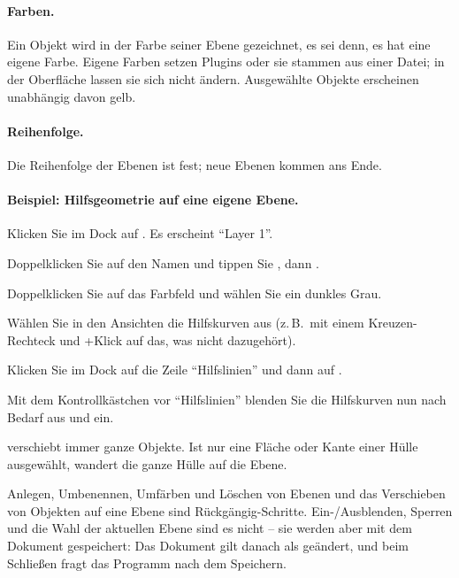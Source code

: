 \paragraph{Farben.} Ein Objekt wird in der Farbe seiner Ebene gezeichnet, es sei denn, es hat
eine eigene Farbe. Eigene Farben setzen Plugins oder sie stammen aus einer Datei; in der
Oberfläche lassen sie sich nicht ändern. Ausgewählte Objekte erscheinen unabhängig davon gelb.

\paragraph{Reihenfolge.} Die Reihenfolge der Ebenen ist fest; neue Ebenen kommen ans Ende.

\paragraph{Beispiel: Hilfsgeometrie auf eine eigene Ebene.}
\begin{schritte}
  \item Klicken Sie im Dock  auf . Es erscheint \enquote{Layer 1}.
  \item Doppelklicken Sie auf den Namen und tippen Sie , dann .
  \item Doppelklicken Sie auf das Farbfeld und wählen Sie ein dunkles Grau.
  \item Wählen Sie in den Ansichten die Hilfskurven aus (z.\,B.\ mit einem Kreuzen-Rechteck
    und +Klick auf das, was nicht dazugehört).
  \item Klicken Sie im Dock auf die Zeile \enquote{Hilfslinien} und dann auf .
  \item Mit dem Kontrollkästchen vor \enquote{Hilfslinien} blenden Sie die Hilfskurven nun nach
    Bedarf aus und ein.
\end{schritte}

\begin{hinweis}
 verschiebt immer ganze Objekte. Ist nur eine Fläche oder Kante einer
Hülle ausgewählt, wandert die ganze Hülle auf die Ebene.
\end{hinweis}

\begin{hinweis}
Anlegen, Umbenennen, Umfärben und Löschen von Ebenen und das Verschieben von Objekten auf eine
Ebene sind Rückgängig-Schritte. Ein-/Ausblenden, Sperren und die Wahl der aktuellen Ebene sind
es nicht -- sie werden aber mit dem Dokument gespeichert: Das Dokument gilt danach als geändert,
und beim Schließen fragt das Programm nach dem Speichern.
\end{hinweis}


